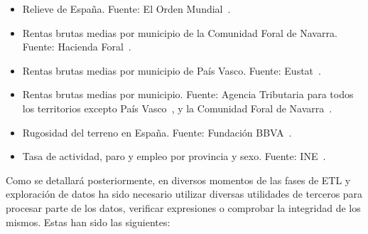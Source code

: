 \begin{itemize}
    \item Relieve de España. Fuente: El Orden Mundial~\cite{relieve}.
    \item Rentas brutas medias por municipio de la Comunidad Foral de Navarra. Fuente: Hacienda Foral~\cite{renta_navarra}.
    \item Rentas brutas medias por municipio de País Vasco. Fuente: Eustat~\cite{renta_euskadi, PIB_pais_vasco}.
    \item Rentas brutas medias por municipio. Fuente: Agencia Tributaria para todos los territorios excepto País Vasco~\cite{renta}, y la Comunidad Foral de Navarra~\cite{renta_navarra}.
    \item Rugosidad del terreno en España. Fuente: Fundación BBVA~\cite{rugosidad}.
    \item Tasa de actividad, paro y empleo por provincia y sexo. Fuente: INE~\cite{INE_empleo}.
\end{itemize}

Como se detallará posteriormente, en diversos momentos de las fases de ETL y exploración de datos ha sido necesario utilizar diversas utilidades de terceros para procesar parte de los datos, verificar expresiones o comprobar la integridad de los mismos. Estas han sido las siguientes:

